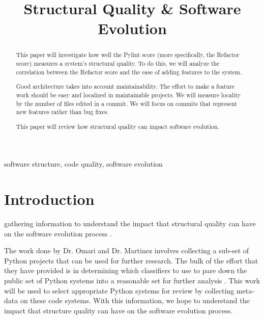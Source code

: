 \documentclass[conference]{IEEEtran}
\begin{document}
\title{Structural Quality \& Software Evolution}

\author{
}

\maketitle

\begin{abstract}
This paper will investigate how well the Pylint score (more specifically, the Refactor score) measures a system's structural quality. To do this, we will analyze the correlation between the Refactor score and the ease of adding features to the system.

Good architecture takes into account maintainability. The effort to make a feature work should be easy and localized in maintainable projects. We will measure locality by the number of files edited in a commit. We will focus on commits that represent new features rather than bug fixes.

This paper will review how structural quality can impact software evolution.
\end{abstract}

\begin{IEEEkeywords}
software structure, code quality, software evolution
\end{IEEEkeywords}

\section{Introduction}

gathering information to understand the impact that structural quality can have on the software evolution process . 

The work done by Dr. Omari and Dr. Martinez involves collecting a sub-set of Python projects that can be used for further research. The bulk of the effort that they have provided is in determining which classifiers to use to pare down the public set of Python systems into a reasonable set for further analysis \cite{omari:2018}. This work will be used to select appropriate Python systems for review by collecting meta-data on these code systems. With this information, we hope to understand the impact that structure quality can have on the software evolution process.
\end{document}
